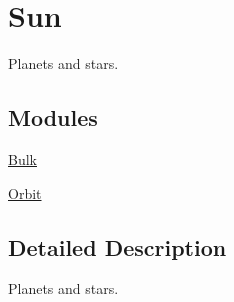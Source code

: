 \hypertarget{group___e_g_x_phys-_constants-_astrophysics-_solar_system-_sun}{}\section{Sun}
\label{group___e_g_x_phys-_constants-_astrophysics-_solar_system-_sun}


Planets and stars.  


\subsection*{Modules}
\begin{DoxyCompactItemize}
\item 
\mbox{\hyperlink{group___e_g_x_phys-_constants-_astrophysics-_solar_system-_sun-_bulk}{Bulk}}
\item 
\mbox{\hyperlink{group___e_g_x_phys-_constants-_astrophysics-_solar_system-_sun-_orbit}{Orbit}}
\end{DoxyCompactItemize}


\subsection{Detailed Description}
Planets and stars. 

